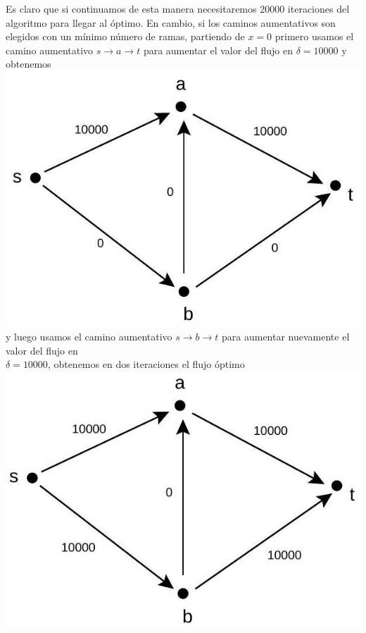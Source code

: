 \documentclass[10pt]{article}
\begin{document}
Es claro que si continuamos de esta manera necesitaremos 20000 iteraciones del algoritmo para llegar al óptimo. En cambio, si los caminos aumentativos son elegidos con un mínimo número de ramas, partiendo de $x=0$ primero usamos el camino aumentativo $s \longrightarrow a \longrightarrow t$ para aumentar el valor del flujo en $\delta=10000$ y obtenemos\\
\includegraphics[max width=\textwidth, center]{2025_09_05_aa5f7b8425e7dd302062g-13(1)}\\
y luego usamos el camino aumentativo $s \longrightarrow b \longrightarrow t$ para aumentar nuevamente el valor del flujo en\\
$\delta=10000$, obtenemos en dos iteraciones el flujo óptimo\\
\includegraphics[max width=\textwidth, center]{2025_09_05_aa5f7b8425e7dd302062g-14(1)}
\end{document}
